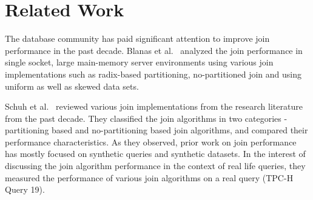 \section{Related Work}
The database community has paid significant attention to improve join performance in the past decade. 
Blanas et al.~\cite{DBLP:conf/sigmod/BlanasLP11} analyzed the join performance in single socket, large main-memory server environments using various join implementations such as radix-based partitioning, no-partitioned join and using uniform as well as skewed data sets. 

Schuh et al.~\cite{DBLP:conf/sigmod/SchuhCD16} reviewed various join implementations from the research literature from the past decade. 
They classified the join algorithms in two categories - partitioning based and no-partitioning based join algorithms, and compared their performance characteristics. 
As they observed, prior work on join performance has mostly focused on synthetic queries and synthetic datasets. 
In the interest of discussing the join algorithm performance in the context of real life queries, they measured the performance of various join algorithms on a real query (TPC-H Query 19). 